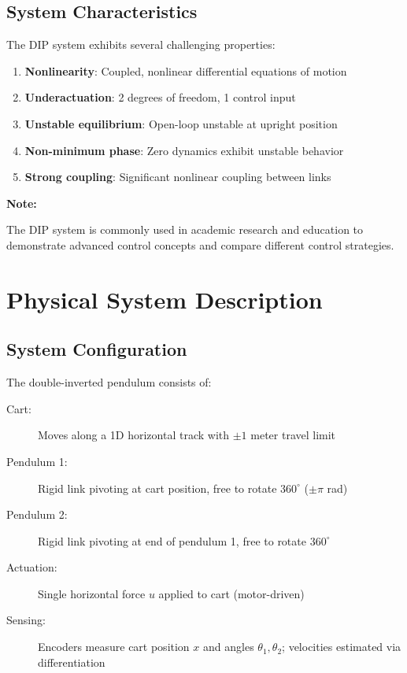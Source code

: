 \documentclass[11pt,a4paper]{article}
\newenvironment{note}[1][Note]{%
  \par\noindent\textcolor{noteblue}{\textbf{#1:}}\quad
}{\par}
\begin{document}
\subsection{System Characteristics}

The DIP system exhibits several challenging properties:

\begin{enumerate}
    \item \textbf{Nonlinearity}: Coupled, nonlinear differential equations of motion
    \item \textbf{Underactuation}: 2 degrees of freedom, 1 control input
    \item \textbf{Unstable equilibrium}: Open-loop unstable at upright position
    \item \textbf{Non-minimum phase}: Zero dynamics exhibit unstable behavior
    \item \textbf{Strong coupling}: Significant nonlinear coupling between links
\end{enumerate}

\begin{note}
The DIP system is commonly used in academic research and education to demonstrate advanced control concepts and compare different control strategies.
\end{note}


\section{Physical System Description}

\subsection{System Configuration}

The double-inverted pendulum consists of:

\begin{description}
    \item[Cart:] Moves along a 1D horizontal track with $\pm 1$ meter travel limit
    \item[Pendulum 1:] Rigid link pivoting at cart position, free to rotate $360^\circ$ ($\pm\pi$ rad)
    \item[Pendulum 2:] Rigid link pivoting at end of pendulum 1, free to rotate $360^\circ$
    \item[Actuation:] Single horizontal force $u$ applied to cart (motor-driven)
    \item[Sensing:] Encoders measure cart position $x$ and angles $\theta_1, \theta_2$; velocities estimated via differentiation
\end{description}
\end{document}
